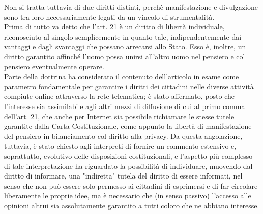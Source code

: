 Non si tratta tuttavia di due diritti distinti, perchè manifestazione e divulgazione sono tra loro necessariamente legati da un vincolo di strumentalità. 
\\Prima di tutto va detto che l'art. 21 è un diritto di libertà individuale, riconosciuto al singolo semplicemente in quanto tale, indipendentemente dai vantaggi e dagli svantaggi che possano arrecarsi allo Stato. Esso è, inoltre, un diritto garantito affinché l'uomo possa unirsi all'altro uomo nel pensiero e col pensiero eventualmente operare.
\\Parte della dottrina ha considerato il contenuto dell'articolo in esame come parametro fondamentale per garantire i diritti dei cittadini nelle diverse attività compiute online attraverso la rete telematica; è stato affermato, posto che l'interesse sia assimilabile agli altri mezzi di diffusione di cui al primo comma dell'art. 21, che anche per Internet sia possibile richiamare le stesse tutele garantite dalla Carta Costituzionale, come appunto la libertà di manifestazione del pensiero in bilanciamento col diritto alla privacy. Da questa angolazione, tuttavia, è stato chiesto agli interpreti di fornire un commento estensivo e, soprattutto, evolutivo delle disposizioni costituzionali, e l'aspetto più complesso di tale interpretazione ha riguardato la possibilità di individuare, muovendo dal diritto di informare, una "indiretta" tutela del diritto di essere informati, nel senso che non può essere solo permesso ai cittadini di esprimersi e di far circolare liberamente le proprie idee, ma è necessario che (in senso passivo) l'accesso alle opinioni altrui sia assolutamente garantito a tutti coloro che ne abbiano interesse.


